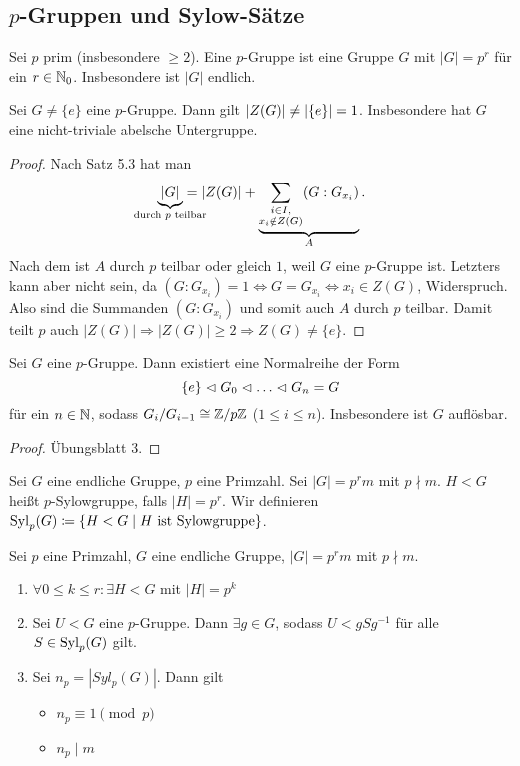 \documentclass[12pt,a4paper]{scrartcl}
\begin{document}
\subsection{\texorpdfstring{$p$}{p}-Gruppen und Sylow-Sätze}
\begin{defi}
	Sei $p$ prim (insbesondere $\geq 2$). Eine $p$-Gruppe ist eine Gruppe $G$ mit $|G| = p^r$ für ein $r\in\IN_0$. Insbesondere ist $|G|$ endlich.
\end{defi}
\begin{satz}
	Sei $G\neq\{e\}$ eine $p$-Gruppe. Dann gilt $\abs{Z(G)}\neq \abs*{\{e\}} = 1$. Insbesondere hat $G$ eine nicht-triviale abelsche Untergruppe.
\end{satz}
\begin{proof}
	Nach Satz 5.3 hat man \[ \underbrace{|G|}_{\mathclap{\text{durch $p$ teilbar}}}  = |Z(G)| + \underbrace{\sum_{\substack{i\in I,\\x_i\notin Z(G)}}(G: G_{x_i})}_{A}.\] Nach dem  ist $A$ durch $p$ teilbar oder gleich $1$, weil $G$ eine $p$-Gruppe ist. Letzters kann aber nicht sein, da $(G:G_{x_i}) = 1 \Leftrightarrow G = G_{x_i}\Leftrightarrow x_i\in Z(G)$, Widerspruch. Also sind die Summanden $(G:G_{x_i})$ und somit auch $A$ durch $p$ teilbar. Damit teilt $p$ auch $|Z(G)|\Rightarrow |Z(G)|\geq 2\Rightarrow Z(G)\neq \{e\}$.
\end{proof}

\begin{satz}
	Sei $G$ eine $p$-Gruppe. Dann existiert eine Normalreihe der Form
	$$ \{e\}\nt G_0\nt\dots\nt G_n = G$$ für ein $n\in\IN$, sodass $G_i/G_{i-1}\cong \IZ/p\IZ$ \textup($1\le i\le n$\textup).
	Insbesondere ist $G$ auflösbar.
\end{satz}
\begin{proof}
	Übungsblatt 3.
\end{proof}

\begin{defi}
	Sei $G$ eine endliche Gruppe, $p$ eine Primzahl. Sei $|G| = p^rm$ mit $p\nmid m$. $H<G$ heißt $p$-Sylowgruppe, falls $|H| = p^r$. Wir definieren  $\Syl_p(G)\coloneqq\{H<G\mid H\text{ ist Sylowgruppe}\}$.
\end{defi}

\begin{satz}[Sylowsätze] \label{thm:sylow}
	Sei $p$ eine Primzahl, $G$ eine endliche Gruppe, $|G| = p^rm$ mit $p\nmid m$.\begin{enumerate}
		\item $\forall 0\le k\le r \colon\exists H<G$ mit $|H| = p^k$
		\item Sei $U<G$ eine $p$-Gruppe. Dann $\exists g\in G$, sodass $U<gSg^{-1}$ für alle $S\in \Syl_p(G)$ gilt.
		\item Sei $n_p = |Syl_p(G)|$. Dann gilt \begin{itemize}
			\item $n_p\equiv 1\pmod p$
			\item $n_p\mid m$
		\end{itemize}
	\end{enumerate}
\end{satz}
\end{document}
